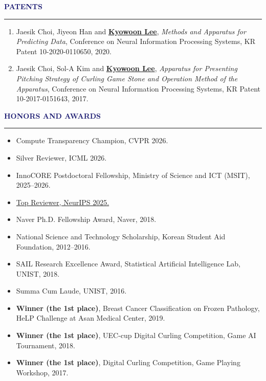 \documentclass{resume} %
\renewenvironment{rSection}[1]{
\sectionskip
\textcolor{MidnightBlue}{\MakeUppercase{#1}}
\sectionlineskip
\hrule
\begin{list}{}{
\setlength{\leftmargin}{1.5em}
}
\item[]
}{
\end{list}
}
\begin{document}
\begin{rSection}{\bf Patents}
\begin{enumerate}
    \item Jaesik Choi, Jiyeon Han and \underline{\textbf{Kyowoon Lee}}, \emph{Methods and Apparatus for Predicting Data}, Conference on Neural Information Processing Systems, KR Patent 10-2020-0110650, 2020.
    \item Jaesik Choi, Sol-A Kim and \underline{\textbf{Kyowoon Lee}}, \emph{Apparatus for Presenting Pitching Strategy of Curling Game Stone and Operation Method of the Apparatus}, Conference on Neural Information Processing Systems, KR Patent 10-2017-0151643, 2017.
\end{enumerate}
\end{rSection}


\begin{rSection}{\bf Honors and Awards}
	\begin{itemize}
		\item Compute Transparency Champion, CVPR 2026.
		\item Silver Reviewer, ICML 2026.
		\item InnoCORE Postdoctoral Fellowship, Ministry of Science and ICT (MSIT), 2025--2026.
		\item \href{https://neurips.cc/Conferences/2025/ProgramCommittee#top-reviewer}{Top Reviewer, NeurIPS 2025.}
		\item Naver Ph.D. Fellowship Award, Naver, 2018.
		\item National Science and Technology Scholarship, Korean Student Aid Foundation, 2012--2016.
		\item SAIL Research Excellence Award, Statistical Artificial Intelligence Lab, UNIST, 2018.
		\item Summa Cum Laude, UNIST, 2016.
		\item \textbf{Winner (the 1st place)}, Breast Cancer Classification on Frozen Pathology, HeLP Challenge at Asan Medical Center, 2019.
		\item \textbf{Winner (the 1st place)}, UEC-cup Digital Curling Competition, Game AI Tournament, 2018.
		\item \textbf{Winner (the 1st place)}, Digital Curling Competition, Game Playing Workshop, 2017.
	\end{itemize}
\end{rSection}
\end{document}

